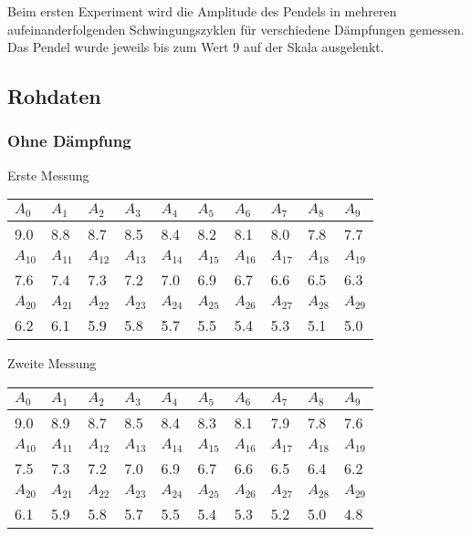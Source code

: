 \documentclass[12pt,a4paper]{article}
\begin{document}
Beim ersten Experiment wird die Amplitude des Pendels in mehreren aufeinanderfolgenden Schwingungszyklen für verschiedene Dämpfungen gemessen. Das Pendel wurde jeweils bis zum Wert 9 auf der Skala ausgelenkt.

\subsection*{Rohdaten}
\subsubsection*{Ohne D\"ampfung}
Erste Messung

\vspace{3pt}
\begin{tabular}{|l|l|l|l|l|l|l|l|l|l|}
\hline
$A_{0}$&$A_{1}$&$A_{2}$&$A_{3}$&$A_{4}$&$A_{5}$&$A_{6}$&$A_{7}$&$A_{8}$&$A_{9}$\\
\hline
9.0&8.8&8.7&8.5&8.4&8.2&8.1&8.0&7.8&7.7\\
\hline
\hline
$A_{10}$&$A_{11}$&$A_{12}$&$A_{13}$&$A_{14}$&$A_{15}$&$A_{16}$&$A_{17}$&$A_{18}$&$A_{19}$\\
\hline
7.6&7.4&7.3&7.2&7.0&6.9&6.7&6.6&6.5&6.3\\
\hline
\hline
$A_{20}$&$A_{21}$&$A_{22}$&$A_{23}$&$A_{24}$&$A_{25}$&$A_{26}$&$A_{27}$&$A_{28}$&$A_{29}$\\
\hline
6.2&6.1&5.9&5.8&5.7&5.5&5.4&5.3&5.1&5.0\\
\hline
\end{tabular}

\vspace{10pt}
Zweite Messung

\vspace{3pt}
\begin{tabular}{|l|l|l|l|l|l|l|l|l|l|}
\hline
$A_{0}$&$A_{1}$&$A_{2}$&$A_{3}$&$A_{4}$&$A_{5}$&$A_{6}$&$A_{7}$&$A_{8}$&$A_{9}$\\
\hline
9.0&8.9&8.7&8.5&8.4&8.3&8.1&7.9&7.8&7.6\\
\hline
\hline
$A_{10}$&$A_{11}$&$A_{12}$&$A_{13}$&$A_{14}$&$A_{15}$&$A_{16}$&$A_{17}$&$A_{18}$&$A_{19}$\\
\hline
7.5&7.3&7.2&7.0&6.9&6.7&6.6&6.5&6.4&6.2\\
\hline
\hline
$A_{20}$&$A_{21}$&$A_{22}$&$A_{23}$&$A_{24}$&$A_{25}$&$A_{26}$&$A_{27}$&$A_{28}$&$A_{29}$\\
\hline
6.1&5.9&5.8&5.7&5.5&5.4&5.3&5.2&5.0&4.8\\
\hline
\end{tabular}
\end{document}

